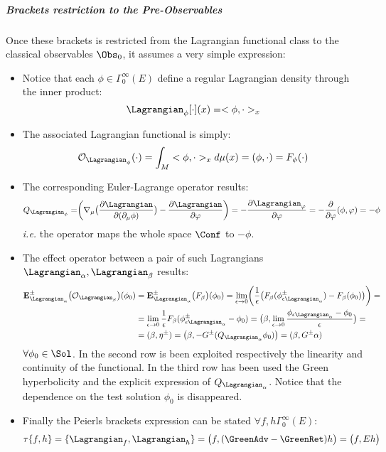 \documentclass[Main]{subfiles}
\begin{document}
			\subparagraph{Brackets restriction to the Pre-Observables}
				Once these brackets is restricted from the Lagrangian functional class to the classical observables $\Obs_0$, it assumes a very simple expression:
				\begin{itemize}
					\item Notice that each $\phi \in \Gamma_0^\infty(E)$ define a regular Lagrangian density through the inner product:
						\begin{displaymath}
							\Lagrangian_\phi[\cdot](x) = <\phi, \cdot>_x
						\end{displaymath}
					\item The associated Lagrangian functional is simply:
						\begin{displaymath}
							\mathcal{O}_{\Lagrangian_\phi} (\cdot ) = \int_M  <\phi, \cdot>_x d\mu(x) = (\phi, \cdot) = F_\phi (\cdot)
						\end{displaymath}
					\item The corresponding Euler-Lagrange operator  results:
						\begin{displaymath}
							Q_{\Lagrangian_\phi}= \biggr( \nabla_\mu \big( \frac{\partial \Lagrangian}{\partial ( \partial_\mu \phi)} \big) - \frac{\partial \Lagrangian}{\partial \varphi} \biggr) = - \frac{\partial \Lagrangian_\varphi}{\partial \varphi} = -\frac{\partial}{\partial \varphi} (\phi, \varphi) = -\phi
						\end{displaymath}
						\textit{i.e.} the operator maps the whole space $\Conf$ to $-\phi$.
					\item The effect operator between a pair of such Lagrangians $\Lagrangian_\alpha, \Lagrangian_\beta$ results:
						\begin{align}
						\mathbf{E}_{\Lagrangian_\alpha}^\pm \big( \mathcal{O}_{\Lagrangian_\beta} \big) (\phi_0) &= \mathbf{E}_{\Lagrangian_\alpha}^\pm \big( F_\beta  \big) (\phi_0) = \lim_{\epsilon \rightarrow 0} \biggr( \frac{1}{\epsilon}\big(F_\beta ( \phi_{\epsilon \Lagrangian_\alpha}^\pm) - F_\beta(\phi_0) \big) \biggr) =\\
							&= \lim_{\epsilon \rightarrow 0} \frac{1}{\epsilon}F_\beta( \phi_{\epsilon \Lagrangian_\alpha}^\pm - \phi_0) = 
							\big(\beta, \lim_{\epsilon\rightarrow 0} \frac{ \phi_{\epsilon \Lagrangian_\alpha}  - \phi_0}{\epsilon} \big) = \\
							&=(\beta, \eta^\pm) = \big( \beta, - G^\pm (Q_{\Lagrangian_\alpha} \phi_0 ) \big) = ( \beta, G^\pm \alpha)
						\end{align}
						 $\forall 	\phi_0\in \Sol$.
						 In the second row is been exploited respectively the linearity and continuity of the functional.
						 In the third row has been used the Green hyperbolicity and the explicit expression of $Q_{\Lagrangian_\alpha}$.
						 Notice that the dependence on the test solution $\phi_0$ is disappeared.
					\item Finally the Peierls brackets expression can be stated $\forall f,h \Gamma_0^\infty (E)$:
						\begin{equation}\label{Def:SymplecticTau}
							\tau\{f,h\} = \{\Lagrangian_f , \Lagrangian_h\} = \big( f , (\GreenAdv - \GreenRet)h \big) = \big(f, E h\big)
						\end{equation}
				\end{itemize}
\end{document}
